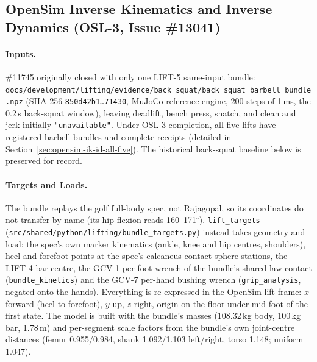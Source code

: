 \documentclass[11pt,a4paper]{article}
\begin{document}
\subsection{OpenSim Inverse Kinematics and Inverse Dynamics (OSL-3, Issue \#13041)}
\paragraph{Inputs.} \#11745 originally closed with only one LIFT-5 same-input bundle:
\texttt{docs/development/lifting/evidence/back\_squat/back\_squat\_barbell\_bundle.npz}
(SHA-256 \texttt{850d42b1\ldots 71430}, MuJoCo reference engine, 200 steps of
1\,ms, the 0.2\,s back-squat window), leaving deadlift, bench press, snatch, and clean and jerk
initially \texttt{"unavailable"}.
Under OSL-3 completion, all five lifts have registered barbell bundles and complete receipts
(detailed in Section~\ref{sec:opensim-ik-id-all-five}). The historical back-squat baseline
below is preserved for record.

\paragraph{Targets and Loads.} The bundle replays the golf full-body spec, not
Rajagopal, so its coordinates do not transfer by name (its hip flexion reads
160--171$^\circ$). \texttt{lift\_targets}
(\texttt{src/shared/python/lifting/bundle\_targets.py}) instead takes geometry
and load: the spec's own marker kinematics (ankle, knee and hip centres,
shoulders), heel and forefoot points at the spec's calcaneus contact-sphere
stations, the LIFT-4 bar centre, the GCV-1 per-foot wrench of the bundle's
shared-law contact (\texttt{bundle\_kinetics}) and the GCV-7 per-hand bushing
wrench (\texttt{grip\_analysis}, negated onto the hands). Everything is
re-expressed in the OpenSim lift frame: $x$ forward (heel to forefoot), $y$ up,
$z$ right, origin on the floor under mid-foot of the first state. The model is
built with the bundle's masses (108.32\,kg body, 100\,kg bar, 1.78\,m) and
per-segment scale factors from the bundle's own joint-centre distances
(femur 0.955/0.984, shank 1.092/1.103 left/right, torso 1.148; uniform 1.047).
\end{document}

